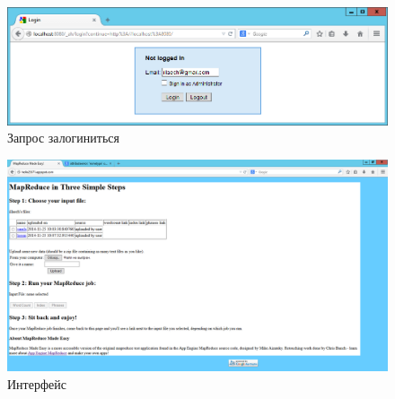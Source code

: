 \documentclass[pscyr,10pt]{hedlab}
\begin{document}
  \begin{figure}[h!]
    \center
    \includegraphics[width=.7\textwidth]{06} \\
    Запрос залогиниться
  \end{figure}
  \vspace{-1.5em}
  \begin{figure}[h!]
    \center
    \includegraphics[width=.7\textwidth]{08_0} \\
    Интерфейс
  \end{figure}
  
  \newpage
  
\end{document}
